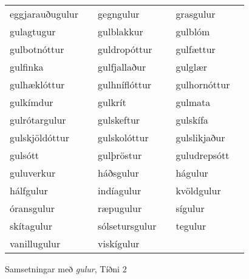 \documentclass[../samsetningasafn.tex]{subfiles}
\begin{document}
\begin{wordlist}[H]
\begin{tcolorbox}

	\setlength{\extrarowheight}{3pt}
	\begin{tabular}{BlBlBl}	
		eggjarauðugulur		& 		& 	
		gegngulur			&		& 		
		grasgulur			&		\\ 		
		gulagtugur			&		& 		
		gulblakkur			&		& 		
		gulblóm				&		\\ 		
		gulbotnóttur			&		& 	
		guldropóttur			&		& 	
		gulfættur			&		\\ 		
		gulfinka				&		& 		
		gulfjallaður			&		& 		
		gulglær				&		\\ 		
		gulhæklóttur			&		& 	
		gulhníflóttur			&		& 	
		gulhornóttur			&		\\ 	
		gulkímdur			&		& 		
		gulkrít				&		& 		
		gulmata				&		\\ 	
		gulrótargulur			&		& 	
		gulskeftur			&		& 		
		gulskífa				&		\\ 		
		gulskjöldóttur		&		& 	
		gulskolóttur			&		& 	
		gulslikjaður			&		\\ 		
		gulsótt				&		& 		
		gulþröstur			&		& 	
		guludrepsótt			&		\\ 	
		guluverkur			&		& 		
		háðsgulur			&		& 		
		hágulur				&		\\ 	
		hálfgulur				&		& 	
		indíagulur			&		& 	
		kvöldgulur			&		\\ 	
		óransgulur			&		& 	
		ræpugulur			&		& 	
		sígulur				&		\\ 		
		skítagulur			&		& 	
		sólsetursgulur		&		& 	
		tegulur				&		\\ 		
		vanillugulur			&		& 	
		viskígulur			&		& 	
							&
	\end{tabular}

\end{tcolorbox}
	\caption{Samsetningar með \textit{gulur}, Tíðni 2}
	\label{listi:gult.2}
\end{wordlist}						
\end{document}
